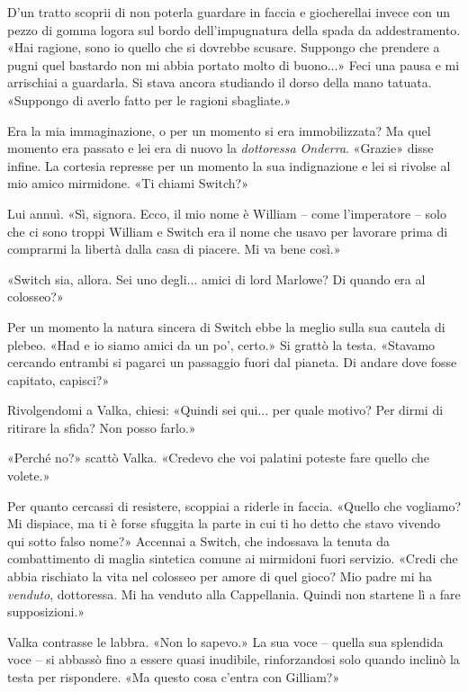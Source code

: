 D'un tratto scoprii di non poterla guardare in faccia e giocherellai
invece con un pezzo di gomma logora sul bordo dell'impugnatura della
spada da addestramento. «Hai ragione, sono io quello che si dovrebbe
scusare. Suppongo che prendere a pugni quel bastardo non mi abbia
portato molto di buono...» Feci una pausa e mi arrischiai a guardarla.
Si stava ancora studiando il dorso della mano tatuata. «Suppongo di
averlo fatto per le ragioni sbagliate.»

Era la mia immaginazione, o per un momento si era immobilizzata? Ma quel
momento era passato e lei era di nuovo la \emph{dottoressa Onderra}.
«Grazie» disse infine. La cortesia represse per un momento la sua
indignazione e lei si rivolse al mio amico mirmidone. «Ti chiami
Switch?»

Lui annuì. «Sì, signora. Ecco, il mio nome è William -- come
l'imperatore -- solo che ci sono troppi William e Switch era il nome che
usavo per lavorare prima di comprarmi la libertà dalla casa di piacere.
Mi va bene così.»

«Switch sia, allora. Sei uno degli... amici di lord Marlowe? Di quando
era al colosseo?»

Per un momento la natura sincera di Switch ebbe la meglio sulla sua
cautela di plebeo. «Had e io siamo amici da un po', certo.» Si grattò la
testa. «Stavamo cercando entrambi si pagarci un passaggio fuori dal
pianeta. Di andare dove fosse capitato, capisci?»

Rivolgendomi a Valka, chiesi: «Quindi sei qui... per quale motivo? Per
dirmi di ritirare la sfida? Non posso farlo.»

«Perché no?» scattò Valka. «Credevo che voi palatini poteste fare quello
che volete.»

Per quanto cercassi di resistere, scoppiai a riderle in faccia. «Quello
che vogliamo? Mi dispiace, ma ti è forse sfuggita la parte in cui ti ho
detto che stavo vivendo qui sotto falso nome?» Accennai a Switch, che
indossava la tenuta da combattimento di maglia sintetica comune ai
mirmidoni fuori servizio. «Credi che abbia rischiato la vita nel
colosseo per amore di quel gioco? Mio padre mi ha \emph{venduto},
dottoressa. Mi ha venduto alla Cappellania. Quindi non startene lì a
fare supposizioni.»

Valka contrasse le labbra. «Non lo sapevo.» La sua voce -- quella sua
splendida voce -- si abbassò fino a essere quasi inudibile,
rinforzandosi solo quando inclinò la testa per rispondere. «Ma questo
cosa c'entra con Gilliam?»

